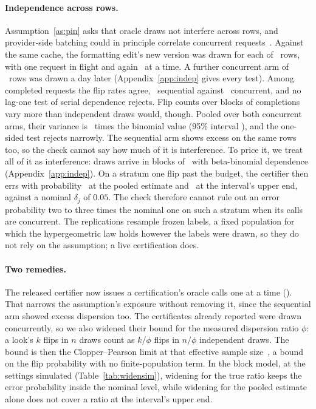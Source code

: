 \ifnum{}\relax
\keeprunin
\paragraph{Independence across rows.} Assumption~\ref{as:pin} asks
that oracle draws not interfere across rows, and provider-side batching
could in principle correlate concurrent requests~\cite{yuan,tml}.
Against the same cache, the formatting edit's new version was drawn for
each of \indepN\ rows, with one request in flight and again
\indepConcurrency\ at a time. A further concurrent arm of
\indepExtRows\ rows was drawn a day later (Appendix~\ref{app:indep}
gives every test). Among completed requests the flip rates agree,
\indepSeqRate\ sequential against \indepConcRate\ concurrent, and no
lag-one test of serial dependence rejects. Flip counts over blocks of
completions vary more than independent draws would, though. Pooled over
both concurrent arms, their variance is \indepPooledDispersion\ times the
binomial value (95\% interval \indepPooledDispersionCi), and the
one-sided test rejects narrowly. The sequential arm shows excess on the
same rows too, so the check cannot say how much of it is interference.
To price it, we treat all of it as interference: draws arrive in
blocks of \indepBlockSize\ with beta-binomial dependence
(Appendix~\ref{app:indep}). On a stratum one flip past the budget, the
certifier then errs with probability \overdispPooled\ at the pooled estimate
and \overdispPooledUpper\ at the interval's upper end, against a nominal
$\delta_j$ of $0.05$. The check therefore cannot rule out an error
probability two to three times the nominal one on such a stratum when
its calls are concurrent. The replications resample frozen labels, a
fixed population for which the hypergeometric law holds however the
labels were drawn, so they do not rely on the assumption; a live
certification does.

\keeprunin
\paragraph{Two remedies.} The released certifier now issues a
certification's oracle calls one at a time (). That
narrows the assumption's exposure without removing it, since the
sequential arm showed excess dispersion too. The certificates already
reported were drawn concurrently, so we also widened their bound for
the measured dispersion ratio $\phi$: a look's $k$ flips in $n$ draws
count as $k/\phi$ flips in $n/\phi$ independent draws. The bound is then
the Clopper--Pearson limit at that effective sample
size~\cite{korngraubard}, a bound on the flip probability with no
finite-population term. In the block model, at the settings simulated
(Table~\ref{tab:widensim}),
widening for the true ratio keeps the error probability inside the
nominal level, while widening
for the pooled estimate alone does not cover a ratio at the interval's
upper end.

